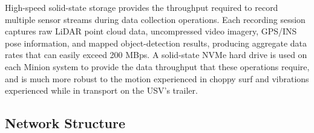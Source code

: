 \documentclass{erauthesis}
\begin{document}



High-speed solid-state storage provides the throughput required to record multiple sensor streams during data collection operations.
Each recording session captures raw \ac{LiDAR} point cloud data, uncompressed video imagery, GPS/INS pose information, and mapped object-detection results, producing aggregate data rates that can easily exceed 200 \ac{MBps}.
A solid-state NVMe hard drive is used on each Minion system to provide the data throughput that these operations require, and is much more robust to the motion experienced in choppy surf and vibrations experienced while in transport on the \ac{USV}'s trailer.




\subsection{Network Structure} \label{comp:network}
\end{document}
